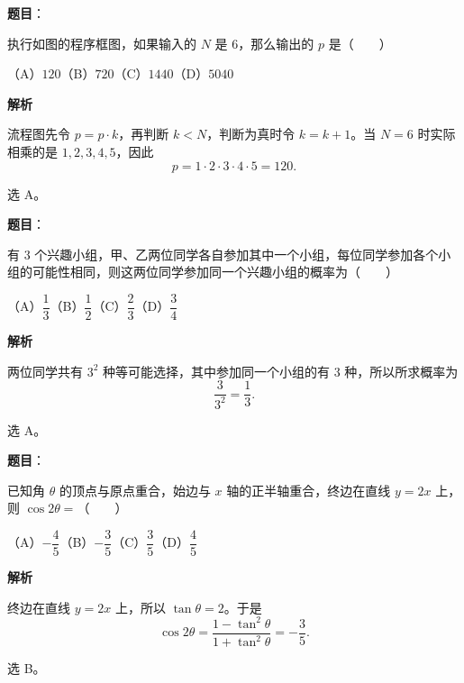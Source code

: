 \begin{answer}

\textbf{题目}：

执行如图的程序框图，如果输入的 $N$ 是 $6$，那么输出的 $p$ 是\mbox{（　　）}
\nopagebreak[4]
\begin{center}\end{center}
\nopagebreak[4]
（A）$120$\quad（B）$720$\quad（C）$1440$\quad（D）$5040$

\textbf{解析}

流程图先令 $p=p\cdot k$，再判断 $k<N$，判断为真时令
$k=k+1$。当 $N=6$ 时实际相乘的是 $1,2,3,4,5$，因此
\nopagebreak[4]
\[
p=1\cdot2\cdot3\cdot4\cdot5=120.
\]

选 A。


\end{answer}
\begin{answer}

\textbf{题目}：

有 $3$ 个兴趣小组，甲、乙两位同学各自参加其中一个小组，每位同学参加各个小组的可能性相同，则这两位同学参加同一个兴趣小组的概率为\mbox{（　　）}

（A）$\dfrac13$\quad（B）$\dfrac12$\quad（C）$\dfrac23$\quad（D）$\dfrac34$

\textbf{解析}

两位同学共有 $3^2$ 种等可能选择，其中参加同一个小组的有
$3$ 种，所以所求概率为
\nopagebreak[4]
\[
\frac3{3^2}=\frac13.
\]

选 A。


\end{answer}
\begin{answer}

\textbf{题目}：

已知角 $\theta$ 的顶点与原点重合，始边与 $x$ 轴的正半轴重合，终边在直线 $y=2x$ 上，则 $\cos2\theta=$\mbox{（　　）}

（A）$-\dfrac45$\quad（B）$-\dfrac35$\quad（C）$\dfrac35$\quad（D）$\dfrac45$

\textbf{解析}

终边在直线 $y=2x$ 上，所以 $\tan\theta=2$。于是
\nopagebreak[4]
\[
\cos2\theta=\frac{1-\tan^2\theta}{1+\tan^2\theta}
=-\frac35.
\]

选 B。


\end{answer}

